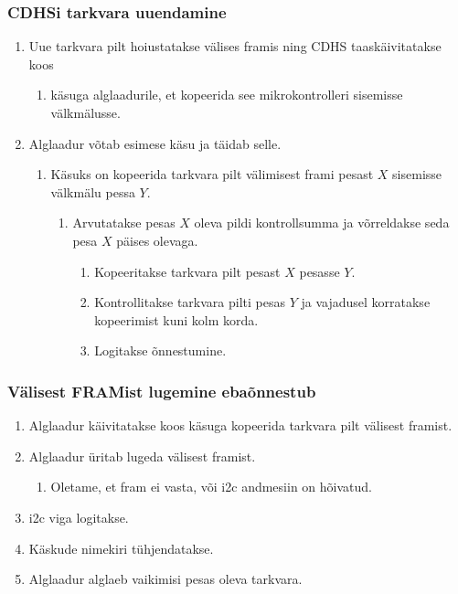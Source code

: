 \documentclass[12pt,a4paper]{article}
\begin{document}
\subsubsection{CDHSi tarkvara uuendamine}
\label{sec:usecase:upgrade}
\begin{enumerate}
	\item Uue tarkvara pilt hoiustatakse välises \gls{fram}is ning CDHS
		taaskäivitatakse koos
		\begin{enumerate}
			\item käsuga alglaadurile, et kopeerida see mikrokontrolleri
				sisemisse välkmälusse.
		\end{enumerate}
	\item Alglaadur võtab esimese käsu ja täidab selle.
		\begin{enumerate}
			\item Käsuks on kopeerida tarkvara pilt välimisest \gls{fram}i pesast \(X\)
				sisemisse välkmälu pessa \(Y\).
				\begin{enumerate}
					\item Arvutatakse pesas \(X\) oleva pildi kontrollsumma ja
						võrreldakse seda pesa \(X\) päises olevaga.
						\begin{enumerate}
							\item Kopeeritakse tarkvara pilt pesast \(X\) pesasse \(Y\).
							\item Kontrollitakse tarkvara pilti pesas \(Y\) ja
								vajadusel korratakse kopeerimist kuni kolm
								korda.
							\item Logitakse õnnestumine.
						\end{enumerate}
				\end{enumerate}
		\end{enumerate}
\end{enumerate}

\subsubsection{Välisest FRAMist lugemine ebaõnnestub}
\label{sec:usecase:framerror}
\begin{enumerate}
	\item Alglaadur käivitatakse koos käsuga kopeerida tarkvara pilt välisest
		\gls{fram}ist.
	\item Alglaadur üritab lugeda välisest \gls{fram}ist.
		\begin{enumerate}
		\item Oletame, et \gls{fram} ei vasta, või \gls{i2c} andmesiin on hõivatud.
		\end{enumerate}
	\item \gls{i2c} viga logitakse.
	\item Käskude nimekiri tühjendatakse.
	\item Alglaadur alglaeb vaikimisi pesas oleva tarkvara.
\end{enumerate}
\end{document}
